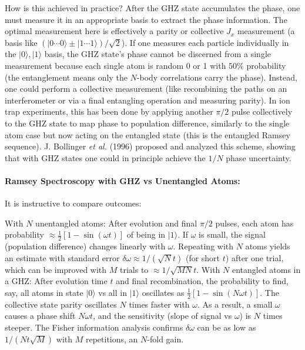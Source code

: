 How is this achieved in practice? After the GHZ state accumulates the
phase, one must measure it in an appropriate basis to extract the
phase information. The optimal measurement here is effectively a
parity or collective $J_x$ measurement (a basis like
$(|0\cdots0\rangle \pm |1\cdots1\rangle)/\sqrt{2}$). If one measures
each particle individually in the ${|0\rangle,|1\rangle}$ basis, the
GHZ state’s phase cannot be discerned from a single measurement
because each single atom is random 0 or 1 with $50\%$ probability (the
entanglement means only the $N$-body correlations carry the
phase). Instead, one could perform a collective measurement (like
recombining the paths on an interferometer or via a final entangling
operation and measuring parity). In ion trap experiments, this has
been done by applying another $\pi/2$ pulse collectively to the GHZ
state to map phase to population difference, similarly to the single
atom case but now acting on the entangled state (this is the entangled
Ramsey sequence). J. Bollinger \textit{et al.} (1996)
\cite{Bollinger1996} proposed and analyzed this scheme, showing that
with GHZ states one could in principle achieve the $1/N$ phase
uncertainty.



\paragraph{Ramsey Spectroscopy with GHZ vs Unentangled Atoms:} It is instructive to compare outcomes:



With $N$ unentangled atoms: After evolution and final $\pi/2$ pulses,
each atom has probability $\approx \frac{1}{2}[1 - \sin(\omega t)]$ of
being in $|1\rangle$. If $\omega$ is small, the signal (population
difference) changes linearly with $\omega$. Repeating with $N$ atoms
yields an estimate with standard error $\delta\omega \approx
1/(\sqrt{N} t)$ (for short $t$) after one trial, which can be improved
with $M$ trials to $\approx 1/\sqrt{M N}t$.  With $N$ entangled atoms
in a GHZ: After evolution time $t$ and final recombination, the
probability to find, say, all atoms in state $|0\rangle$ vs all in
$|1\rangle$ oscillates as $\frac{1}{2}[1 - \sin(N \omega t)]$. The
collective state parity oscillates $N$ times faster with $\omega$. As
a result, a small $\omega$ causes a phase shift $N\omega t$, and the
sensitivity (slope of signal vs $\omega$) is $N$ times steeper. The
Fisher information analysis confirms $\delta\omega$ can be as low as
$1/(N t\sqrt{M})$ with $M$ repetitions, an $N$-fold gain.




